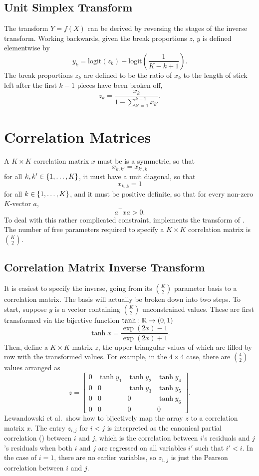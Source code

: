 \subsection{Unit Simplex Transform}

The transform $Y = f(X)$ can be derived by reversing the stages of the
inverse transform.  Working backwards, given the break proportions
$z$, $y$ is defined elementwise by
%
\[
y_k 
= \mbox{logit}(z_k)
+ \mbox{logit}\left(
   \frac{1}{K-k+1}
   \right)
.
\]
%
The break proportions $z_k$ are defined to be the ratio of $x_k$ to
the length of stick left after the first $k-1$ pieces have been broken
off, 
%
\[
z_k 
= \frac{x_k}
       {1 - \sum_{k' = 1}^{k-1} x_{k'}}
.
\]

\section{Correlation Matrices}

A $K \times K$ correlation matrix $x$ must be is a symmetric, so that
%
\[
x_{k,k'} = x_{k',k}
\]
for all $k,k' \in \{ 1,\ldots,K \}$, it must have a unit diagonal,
so that 
\[
x_{k,k} = 1
\]
for all $k \in \{ 1,\ldots,K \}$, and it must be positive
definite, so that for every non-zero $K$-vector $a$,
\[
a^{\top} x a > 0.
\]
To deal with this rather complicated constraint, \Stan implements the
transform of \cite{LewandowskiKurowickaJoe:2009}.  The number of free
parameters required to specify a $K \times K$ correlation matrix is $K
\choose 2$.

\subsection{Correlation Matrix Inverse Transform}

It is easiest to specify the inverse, going from its $K \choose 2$
parameter basis to a correlation matrix.  The basis will actually be
broken down into two steps.  To start, suppose $y$ is a vector
containing $K \choose 2$ unconstrained values.  These are first
transformed via the bijective function $\tanh : \mathbb{R} \rightarrow
(0,1)$
%
\[
\tanh x = \frac{\exp(2x) - 1}{\exp(2x) + 1}.
\]
%
Then, define a $K \times K$ matrix $z$, the upper triangular values of
which are filled by row with the transformed values.  For example, in
the $4 \times 4$ case, there are ${4 \choose 2}$ values arranged as
%
\[
z 
=
\left[
\begin{array}{cccc}
0 & \tanh y_1 & \tanh y_2 & \tanh y_4
\\
0 & 0 & \tanh y_3 & \tanh y_5
\\
0 & 0 & 0 & \tanh y_6
\\
0 & 0 & 0 & 0
\end{array}
\right]
.
\]
%
Lewandowski et al.\ show how to bijectively map the array $z$ to a correlation
matrix $x$.  The entry $z_{i,j}$ for $i < j$ is interpreted as the
canonical partial correlation (\CPC) between $i$ and $j$, which is the
correlation between $i$'s residuals and $j$'s residuals when both $i$
and $j$ are regressed on all variables $i'$ such that $i'< i$.
In the case of $i=1$, there are no earlier variables, 
so $z_{1,j}$ is just the Pearson correlation between $i$ and $j$.

